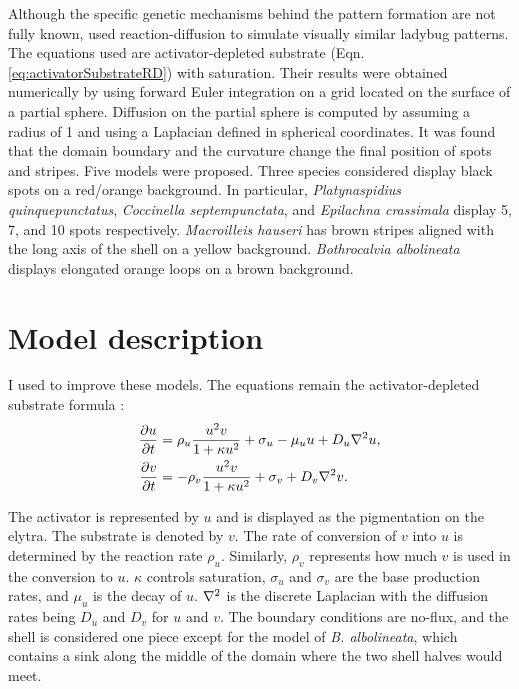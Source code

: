 Although the specific genetic mechanisms behind the pattern formation are not fully known, \citet{liaw2001} used reaction-diffusion to simulate visually similar ladybug patterns. The equations used are activator-depleted substrate (Eqn. \ref{eq:activatorSubstrateRD}) with saturation. Their results were obtained numerically by using forward Euler integration on a grid located on the surface of a partial sphere. Diffusion on the partial sphere is computed by assuming a radius of 1 and using a Laplacian defined in spherical coordinates. It was found that the domain boundary and the curvature change the final position of spots and stripes. Five models were proposed. Three species considered display black spots on a red/orange background. In particular, \textit{Platynaspidius quinquepunctatus}, \textit{Coccinella septempunctata}, and \textit{Epilachna crassimala} display 5, 7, and 10 spots respectively. \textit{Macroilleis hauseri} has brown stripes aligned with the long axis of the shell on a yellow background. \textit{Bothrocalvia albolineata} displays elongated orange loops on a brown background.

\section{Model description} 
I used \ProgramName{} to improve these models. The equations remain the activator-depleted substrate formula \citep{meinhardt1982}:
\begin{equation}
	\begin{aligned} \label{eq:ladybugRD}
   \frac{\partial u}{\partial t} &= \rho_u \frac{u^2v}{1+\kappa u^2} + \sigma_u - \mu_u u + D_u \nabla^2 u, \\
   \frac{\partial v}{\partial t} &= -\rho_v \frac{u^2v}{1+\kappa u^2} + \sigma_v + D_v \nabla^2 v.
	\end{aligned}
\end{equation}

The activator is represented by $u$ and is displayed as the pigmentation on the elytra. The substrate is denoted by $v$. The rate of conversion of $v$ into $u$ is determined by the reaction rate $\rho_u$. Similarly, $\rho_v$ represents how much $v$ is used in the conversion to $u$. $\kappa$ controls saturation, $\sigma_u$ and $\sigma_v$ are the base production rates, and $\mu_u$ is the decay of $u$. $\nabla^2$ is the discrete Laplacian with the diffusion rates being $D_u$ and $D_v$ for $u$ and $v$. The boundary conditions are no-flux, and the shell is considered one piece except for the model of  \textit{B. albolineata}, which contains a sink along the middle of the domain where the two shell halves would meet. 

